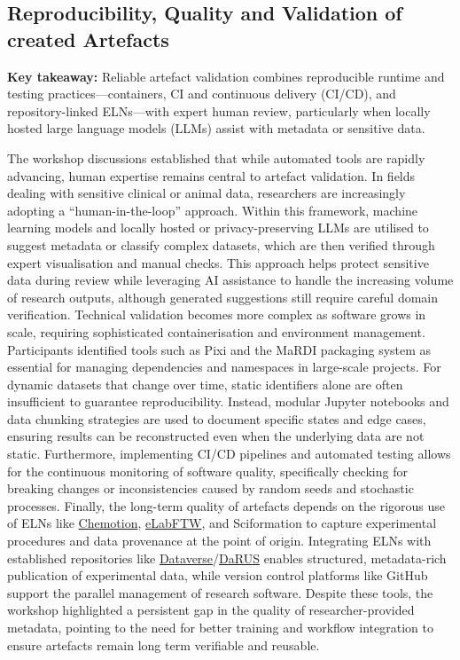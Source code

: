 \documentclass{eceasst}
\newcommand{\elabftw}{\href{https://www.elabftw.net/}{eLabFTW}}
\begin{document}
\subsection{Reproducibility, Quality and Validation of created Artefacts}
\noindent\textbf{Key takeaway:} Reliable artefact validation combines reproducible runtime and testing practices---containers, CI and continuous delivery (CI/CD), and repository-linked ELNs---with expert human review, particularly when locally hosted large language models (LLMs) assist with metadata or sensitive data.

\medskip
\noindent The workshop discussions established that while automated tools are rapidly advancing, human expertise remains central to artefact validation.
In fields dealing with sensitive clinical or animal data, researchers are increasingly adopting a ``human-in-the-loop'' approach.
Within this framework, machine learning models and locally hosted or privacy-preserving LLMs are utilised to suggest metadata or classify complex datasets, which are then verified through expert visualisation and manual checks.
This approach helps protect sensitive data during review while leveraging AI assistance to handle the increasing volume of research outputs, although generated suggestions still require careful domain verification.
Technical validation becomes more complex as software grows in scale, requiring sophisticated containerisation and environment management.
Participants identified tools such as Pixi and the MaRDI packaging system as essential for managing dependencies and namespaces in large-scale projects.
For dynamic datasets that change over time, static identifiers alone are often insufficient to guarantee reproducibility.
Instead, modular Jupyter notebooks and data chunking strategies are used to document specific states and edge cases, ensuring results can be reconstructed even when the underlying data are not static.
Furthermore, implementing CI/CD pipelines and automated testing allows for the continuous monitoring of software quality, specifically checking for breaking changes or inconsistencies caused by random seeds and stochastic processes.
Finally, the long-term quality of artefacts depends on the rigorous use of ELNs like \href{https://chemotion.net/}{Chemotion}, \elabftw, and Sciformation to capture experimental procedures and data provenance at the point of origin.
Integrating ELNs with established repositories like \href{https://dataverse.org/}{Dataverse}/\href{https://darus.uni-stuttgart.de/dataverse/darus}{DaRUS} enables structured, metadata-rich publication of experimental data, while version control platforms like GitHub support the parallel management of research software.
Despite these tools, the workshop highlighted a persistent gap in the quality of researcher-provided metadata, pointing to the need for better training and workflow integration to ensure artefacts remain long term verifiable and reusable.
\end{document}

